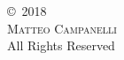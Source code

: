 \phantom{}\vspace{\fill}
\begin{center}
\copyright~2018\\
\textsc{Matteo Campanelli}\\
All Rights Reserved\\
\end{center}